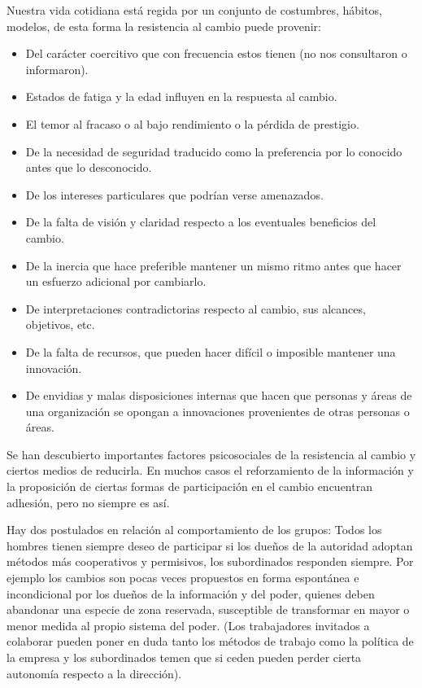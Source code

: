 Nuestra vida cotidiana está regida por un conjunto de costumbres, hábitos, modelos, de esta forma la resistencia al cambio puede provenir:

\begin{itemize}
  \item Del carácter coercitivo que con frecuencia estos tienen (no nos consultaron o informaron).
  \item Estados de fatiga y la edad influyen en la respuesta al cambio.
  \item El temor al fracaso o al bajo rendimiento o la pérdida de prestigio.
  \item De la necesidad de seguridad traducido como la preferencia por lo conocido antes que lo desconocido.
  \item De los intereses particulares que podrían verse amenazados.
  \item De la falta de visión y claridad respecto a los eventuales beneficios del cambio.
  \item De la inercia que hace preferible mantener un mismo ritmo antes que hacer un esfuerzo adicional por cambiarlo.
  \item De interpretaciones contradictorias respecto al cambio, sus alcances, objetivos, etc.
  \item De la falta de recursos, que pueden hacer difícil o imposible mantener una innovación.
  \item De envidias y malas disposiciones internas que hacen que personas y áreas de una organización se opongan a innovaciones provenientes de otras personas o áreas.
\end{itemize}
Se han descubierto importantes factores psicosociales de la resistencia al cambio y ciertos medios de reducirla. En muchos casos el reforzamiento de la información y la proposición de ciertas formas de participación en el cambio encuentran adhesión, pero no siempre es así.

Hay dos postulados en relación al comportamiento de los grupos: Todos los hombres tienen siempre deseo de participar si los dueños de la autoridad adoptan métodos más cooperativos y permisivos, los subordinados responden siempre. Por ejemplo los cambios son pocas veces propuestos en forma espontánea e incondicional por los dueños de la información y del poder, quienes deben abandonar una especie de zona reservada, susceptible de transformar en mayor o menor medida al propio sistema del poder. (Los trabajadores invitados a colaborar pueden poner en duda tanto los métodos de trabajo como la política de la empresa y los subordinados temen que si ceden pueden perder cierta autonomía respecto a la dirección).

